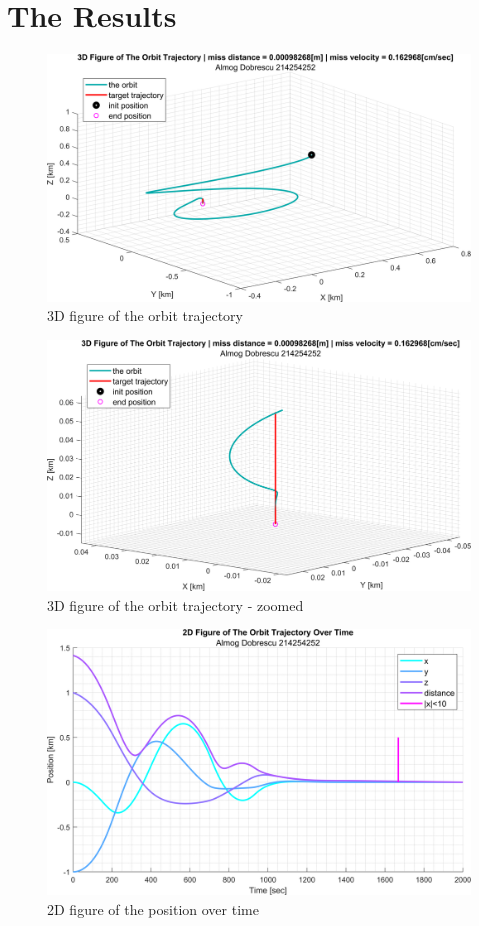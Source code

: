 \documentclass[11pt, a4paper]{article}
\begin{document}
\section{The Results}
\begin{figure}[H]
    \centering
    \includegraphics[width=1\textwidth]{images/graph1.1.png}
    \caption{3D figure of the orbit trajectory}
    \label{fig:3D-plot}
\end{figure}
\begin{figure}[H]
    \centering
    \includegraphics[width=1\textwidth]{images/graph1.2.png}
    \caption{3D figure of the orbit trajectory - zoomed}
    \label{fig:3D-plot-zoomed}
\end{figure}
\begin{figure}[H]
    \centering
    \includegraphics[width=1\textwidth]{images/graph2.png}
    \caption{2D figure of the position over time}
    \label{fig:2D-plot_over_time}
\end{figure}
\end{document}
